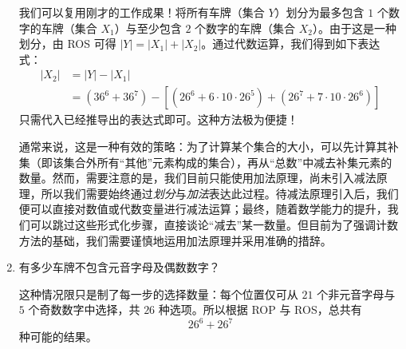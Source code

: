 \begin{example}[车牌]
\begin{enumerate}[label=(\arabic*)]
              我们可以复用刚才的工作成果！将所有车牌（集合 $Y$）划分为最多包含 $1$ 个数字的车牌（集合 $X_1$）与至少包含 $2$ 个数字的车牌（集合 $X_2$）。由于这是一种划分，由 ROS 可得 $|Y| = |X_1| + |X_2|$。通过代数运算，我们得到如下表达式：
              \begin{align*}
                  |X_2| & = |Y| - |X_1|                                                                       \\
                        & = (36^6 + 36^7) - [(26^6 + 6 \cdot 10 \cdot 26^5) + (26^7 + 7 \cdot 10 \cdot 26^6)]
              \end{align*}
              只需代入已经推导出的表达式即可。这种方法极为便捷！

              通常来说，这是一种有效的策略：为了计算某个集合的大小，可以先计算其补集（即该集合外所有``其他''元素构成的集合），再从``总数''中减去补集元素的数量。然而，需要注意的是，我们目前只能使用加法原理，尚未引入减法原理，所以我们需要始终通过\emph{划分}与\emph{加法}表达此过程。待减法原理引入后，我们便可以直接对数值或代数变量进行减法运算；最终，随着数学能力的提升，我们可以跳过这些形式化步骤，直接谈论``减去''某一数量。但目前为了强调计数方法的基础，我们需要谨慎地运用加法原理并采用准确的措辞。\\
        \item 有多少车牌不包含元音字母及偶数数字？

              这种情况限只是制了每一步的选择数量：每个位置仅可从 $21$ 个非元音字母与 $5$ 个奇数数字中选择，共 $26$ 种选项。所以根据 ROP 与 ROS，总共有
              \[26^6 + 26^7\]
              种可能的结果。
    \end{enumerate}
\end{example}